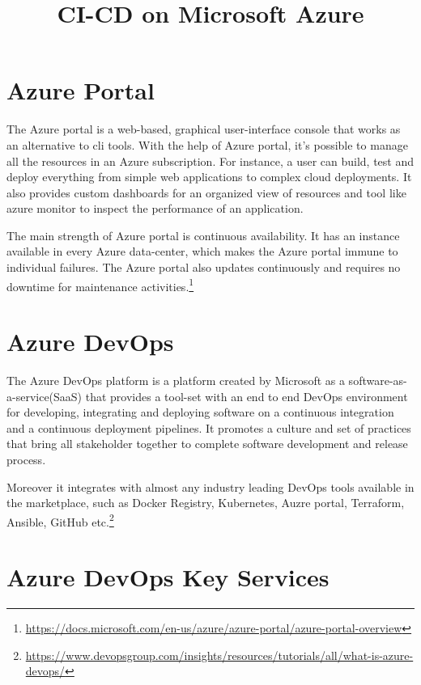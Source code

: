 \documentclass{article}
\title{CI-CD on Microsoft Azure}
\begin{document}
\maketitle

\section{Azure Portal}


The Azure portal is a web-based, graphical user-interface console that works as an alternative to cli tools. With the help of Azure portal, it's possible to manage all the resources in an Azure subscription. For instance, a user can build, test and deploy everything from simple web applications to complex cloud deployments. It also provides custom dashboards for an organized view of resources and tool like azure monitor to inspect the performance of an application.

\par

The main strength of Azure portal is continuous availability. It has an instance available in every Azure data-center, which makes the Azure portal immune to individual failures. The Azure portal also updates continuously and requires no downtime for maintenance activities.\footnote{\url{https://docs.microsoft.com/en-us/azure/azure-portal/azure-portal-overview}}

\section{Azure DevOps}

The Azure DevOps platform is a platform created by Microsoft as a software-as-a-service(SaaS) that provides a tool-set with an end to end DevOps environment for developing, integrating and deploying software on a continuous integration and a continuous deployment pipelines. It promotes a culture and set of practices  that bring all stakeholder together to complete software development and release process. 

\par

Moreover it integrates with almost any industry leading DevOps tools available in the marketplace, such as Docker Registry, Kubernetes, Auzre portal, Terraform, Ansible, GitHub etc.\footnote{\url{https://www.devopsgroup.com/insights/resources/tutorials/all/what-is-azure-devops/}}


\section{Azure DevOps Key Services}
\end{document}
